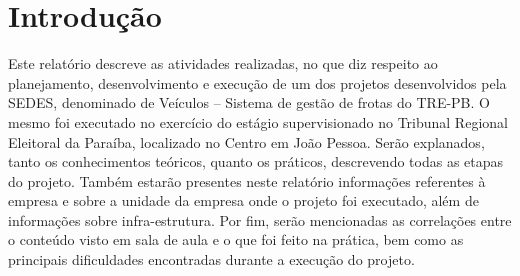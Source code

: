 
\chapter{Introdução}
\label{chap:introducao}


Este relatório descreve as atividades realizadas, no que diz respeito ao planejamento, desenvolvimento e execução de um dos projetos desenvolvidos pela SEDES, denominado de Veículos – Sistema de gestão de frotas do TRE-PB. O mesmo foi executado no exercício do estágio supervisionado no Tribunal Regional Eleitoral da Paraíba, localizado no Centro em João Pessoa.
Serão explanados, tanto os conhecimentos teóricos, quanto os práticos, descrevendo todas as etapas do projeto. Também estarão presentes neste relatório informações referentes à empresa e sobre a unidade da empresa onde o projeto foi executado, além de informações sobre infra-estrutura.
Por fim, serão mencionadas as correlações entre o conteúdo visto em sala de aula e o que foi feito na prática, bem como as principais dificuldades encontradas durante a execução do projeto.




